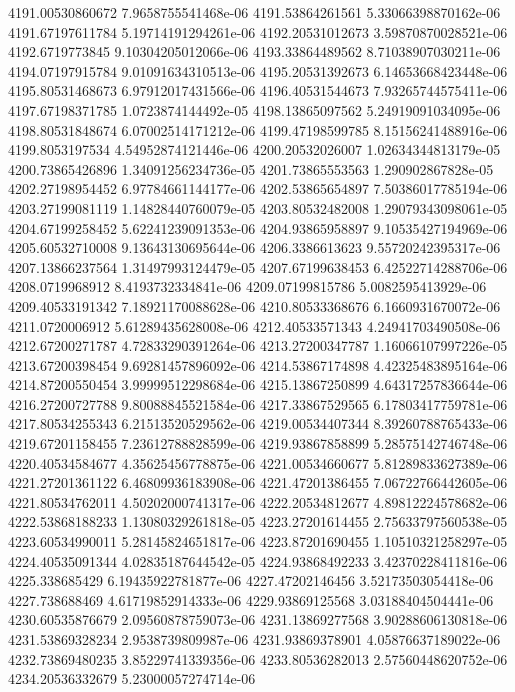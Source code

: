 {4191.00530860672 7.9658755541468e-06
4191.53864261561 5.33066398870162e-06
4191.67197611784 5.19714191294261e-06
4192.20531012673 3.59870870028521e-06
4192.6719773845 9.10304205012066e-06
4193.33864489562 8.71038907030211e-06
4194.07197915784 9.01091634310513e-06
4195.20531392673 6.14653668423448e-06
4195.80531468673 6.97912017431566e-06
4196.40531544673 7.93265744575411e-06
4197.67198371785 1.0723874144492e-05
4198.13865097562 5.24919091034095e-06
4198.80531848674 6.07002514171212e-06
4199.47198599785 8.15156241488916e-06
4199.8053197534 4.54952874121446e-06
4200.20532026007 1.02634344813179e-05
4200.73865426896 1.34091256234736e-05
4201.73865553563 1.290902867828e-05
4202.27198954452 6.97784661144177e-06
4202.53865654897 7.50386017785194e-06
4203.27199081119 1.14828440760079e-05
4203.80532482008 1.29079343098061e-05
4204.67199258452 5.62241239091353e-06
4204.93865958897 9.10535427194969e-06
4205.60532710008 9.13643130695644e-06
4206.3386613623 9.55720242395317e-06
4207.13866237564 1.31497993124479e-05
4207.67199638453 6.42522714288706e-06
4208.0719968912 8.4193732334841e-06
4209.07199815786 5.0082595413929e-06
4209.40533191342 7.18921170088628e-06
4210.80533368676 6.1660931670072e-06
4211.0720006912 5.61289435628008e-06
4212.40533571343 4.24941703490508e-06
4212.67200271787 4.72833290391264e-06
4213.27200347787 1.16066107997226e-05
4213.67200398454 9.69281457896092e-06
4214.53867174898 4.42325483895164e-06
4214.87200550454 3.99999512298684e-06
4215.13867250899 4.64317257836644e-06
4216.27200727788 9.80088845521584e-06
4217.33867529565 6.17803417759781e-06
4217.80534255343 6.21513520529562e-06
4219.00534407344 8.39260788765433e-06
4219.67201158455 7.23612788828599e-06
4219.93867858899 5.28575142746748e-06
4220.40534584677 4.35625456778875e-06
4221.00534660677 5.81289833627389e-06
4221.27201361122 6.46809936183908e-06
4221.47201386455 7.06722766442605e-06
4221.80534762011 4.50202000741317e-06
4222.20534812677 4.89812224578682e-06
4222.53868188233 1.13080329261818e-05
4223.27201614455 2.75633797560538e-05
4223.60534990011 5.28145824651817e-06
4223.87201690455 1.10510321258297e-05
4224.40535091344 4.02835187644542e-05
4224.93868492233 3.42370228411816e-06
4225.338685429 6.19435922781877e-06
4227.47202146456 3.52173503054418e-06
4227.738688469 4.61719852914333e-06
4229.93869125568 3.03188404504441e-06
4230.60535876679 2.09560878759073e-06
4231.13869277568 3.90288606130818e-06
4231.53869328234 2.9538739809987e-06
4231.93869378901 4.05876637189022e-06
4232.73869480235 3.85229741339356e-06
4233.80536282013 2.57560448620752e-06
4234.20536332679 5.23000057274714e-06
}
